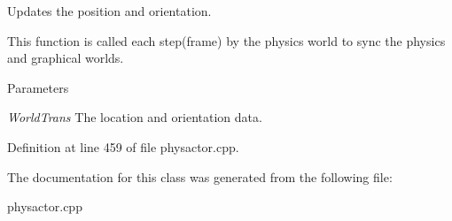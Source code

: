 Updates the position and orientation. 

This function is called each step(frame) by the physics world to sync the physics and graphical worlds. 
\begin{DoxyParams}{Parameters}
\item[{\em WorldTrans}]The location and orientation data. \end{DoxyParams}


Definition at line 459 of file physactor.cpp.



The documentation for this class was generated from the following file:\begin{DoxyCompactItemize}
\item 
physactor.cpp\end{DoxyCompactItemize}
